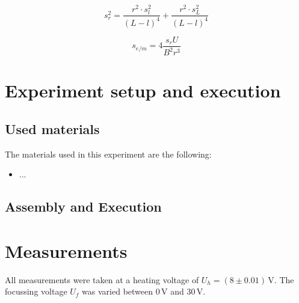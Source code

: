 \documentclass{scrreprt}
\newcommand{\unit}[1]{\ensuremath{\, \mathrm{#1}}}
\begin{document}
\begin{equation}
s_r^2 = \frac{r^2\cdot s_l^2}{(L-l)^4} + \frac{r^2\cdot s_L^2}{(L-l)^4}
\end{equation}

\begin{equation}
s_{e/m} = 4 \frac{s_r U}{B^2 r^3}
\end{equation}

\section{Experiment setup and execution}

\subsection{Used materials}
The materials used in this experiment are the following:
\begin{itemize}
\item ...
\end{itemize}

\subsection{Assembly and Execution}

\section{Measurements}
All measurements were taken at a heating voltage of $U_h = (8 \pm 0.01) \unit{V}$. The focussing voltage $U_f$ was varied between $0 \unit{V}$ and $30 \unit{V}$.
\end{document}
